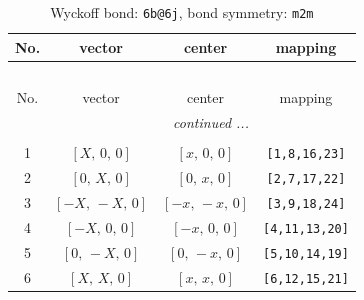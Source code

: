 \documentclass[fleqn,8pt]{jsarticle}
\begin{document}
\renewcommand{\arraystretch}{1.2}
\begin{longtable}{cccc}
\caption{Wyckoff bond: {\tt 6b@6j}, bond symmetry: {\tt m2m}}
 \\
 \hline \hline
No. & vector & center & mapping \\ \hline \endfirsthead

\multicolumn{3}{l}{\tablename\ \thetable{}} \\
 \hline \hline
No. & vector & center & mapping \\ \hline \endhead

 \hline \hline
\multicolumn{3}{r}{\footnotesize\it continued ...} \\ \endfoot

 \hline \hline
\multicolumn{3}{r}{} \\ \endlastfoot

1 & $\left[ X,\, 0,\, 0 \right]$ & $\left[ x,\, 0,\, 0 \right]$ & {\tt [1,8,16,23]} \\ \hline
2 & $\left[ 0,\, X,\, 0 \right]$ & $\left[ 0,\, x,\, 0 \right]$ & {\tt [2,7,17,22]} \\ \hline
3 & $\left[ - X,\, - X,\, 0 \right]$ & $\left[ - x,\, - x,\, 0 \right]$ & {\tt [3,9,18,24]} \\ \hline
4 & $\left[ - X,\, 0,\, 0 \right]$ & $\left[ - x,\, 0,\, 0 \right]$ & {\tt [4,11,13,20]} \\ \hline
5 & $\left[ 0,\, - X,\, 0 \right]$ & $\left[ 0,\, - x,\, 0 \right]$ & {\tt [5,10,14,19]} \\ \hline
6 & $\left[ X,\, X,\, 0 \right]$ & $\left[ x,\, x,\, 0 \right]$ & {\tt [6,12,15,21]} \\
\end{longtable}
\renewcommand{\arraystretch}{1.2}
\end{document}
